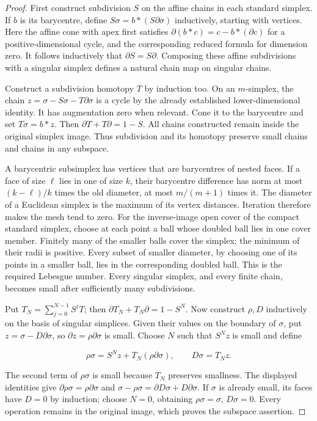 \documentclass[11pt]{article}
\begin{document}
\begin{proof}
First construct subdivision \(S\) on the affine chains in each standard simplex. If \(b\) is its barycentre, define \(S\sigma=b*(S\partial\sigma)\) inductively, starting with vertices. Here the affine cone with apex first satisfies
\(\partial(b*c)=c-b*(\partial c)\) for a positive-dimensional cycle, and the corresponding reduced formula for dimension zero. It follows inductively that \(\partial S=S\partial\). Composing these affine subdivisions with a singular simplex defines a natural chain map on singular chains.

Construct a subdivision homotopy \(T\) by induction too. On an \(m\)-simplex, the chain
\(z=\sigma-S\sigma-T\partial\sigma\) is a cycle by the already established lower-dimensional identity. It has augmentation zero when relevant. Cone it to the barycentre and set \(T\sigma=b*z\). Then
\(\partial T+T\partial=1-S\).
All chains constructed remain inside the original simplex image. Thus subdivision and its homotopy preserve small chains and chains in any subspace.

A barycentric subsimplex has vertices that are barycentres of nested faces. If a face of size \(\ell\) lies in one of size \(k\), their barycentre difference has norm at most \((k-\ell)/k\) times the old diameter, at most \(m/(m+1)\) times it. The diameter of a Euclidean simplex is the maximum of its vertex distances. Iteration therefore makes the mesh tend to zero. For the inverse-image open cover of the compact standard simplex, choose at each point a ball whose doubled ball lies in one cover member. Finitely many of the smaller balls cover the simplex; the minimum of their radii is positive. Every subset of smaller diameter, by choosing one of its points in a smaller ball, lies in the corresponding doubled ball. This is the required Lebesgue number. Every singular simplex, and every finite chain, becomes small after sufficiently many subdivisions.

Put \(T_N=\sum_{j=0}^{N-1}S^jT\); then
\(\partial T_N+T_N\partial=1-S^N\).
Now construct \(\rho,D\) inductively on the basis of singular simplices. Given their values on the boundary of \(\sigma\), put
\(z=\sigma-D\partial\sigma\), so \(\partial z=\rho\partial\sigma\) is small. Choose \(N\) such that \(S^Nz\) is small and define

\[
\rho\sigma=S^Nz+T_N(\rho\partial\sigma),
\qquad D\sigma=T_Nz.
\]

The second term of \(\rho\sigma\) is small because \(T_N\) preserves smallness. The displayed identities give
\(\partial\rho\sigma=\rho\partial\sigma\) and
\(\sigma-\rho\sigma=\partial D\sigma+D\partial\sigma\).
If \(\sigma\) is already small, its faces have \(D=0\) by induction; choose \(N=0\), obtaining \(\rho\sigma=\sigma\), \(D\sigma=0\). Every operation remains in the original image, which proves the subspace assertion.
\end{proof}
\end{document}

